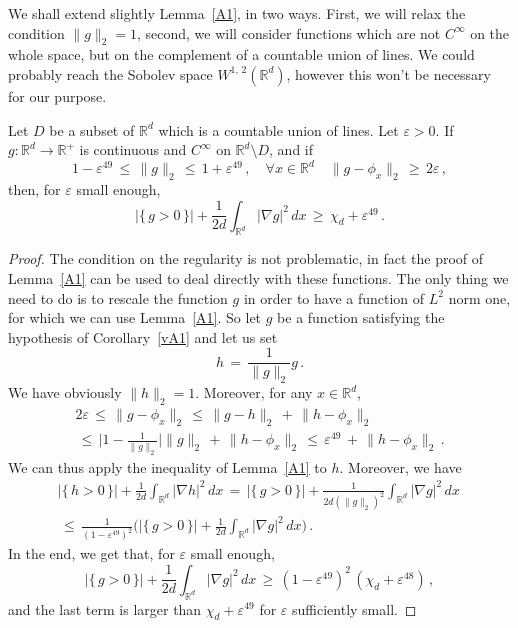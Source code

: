 \documentclass[10pt]{amsart}
\theoremstyle{definition}\newtheorem{defi}[theo]{Definition}\newtheorem{rema}[theo]{Remark}\newtheorem{exam}[theo]{Example}\newtheorem{exem}[theo]{Example}\newtheorem{nota}[theo]{Notation}
\newcommand*\Rd {{\mathbb R^d}}
\newcommand*\R{\mathbb{R}}
\let\oldforall\forall
\renewcommand*{\forall}{\mathrel{\oldforall}}
\begin{document}
We shall extend slightly Lemma~\ref{A1}, in two ways. First, we will relax the condition $\|g\|_2=1$, second, we will consider functions which are not $C^\infty$ on the whole space, but on the complement of a countable union of lines. We could probably reach the Sobolev space $W^{1,\,2}(\Rd)$, however this won't be necessary for our purpose.
\begin{coro}\label{vA1}
Let $D$ be a subset of $\Rd$ which is a countable union of lines. Let $\varepsilon>0$. If $g:\Rd\to\R^+$ is continuous and $C^\infty$ on $\Rd\setminus D$, and if
\[
1-\varepsilon^{49}\,\leq\,\|g\|_2\,\leq\,1 +\varepsilon^{49}\,,\quad
\forall{x\in\Rd}\quad\|g-\phi_x\|_2\,\geq\,2\varepsilon\,,
\]
then, for $\varepsilon$ small enough,
\[
\big|\{\,g>0\,\}\big|+\frac{1}{2d}
\int_{\Rd}\big|\nabla g\big|^2\,dx\,\geq\,\chi_d+\varepsilon^{49}\,.
\]
\end{coro}
\begin{proof}
The condition on the regularity is not problematic, in fact the proof of Lemma~\ref{A1} can be used to deal directly with these functions. The only thing we need to do is to rescale the function $g$ in order to have a function of $L^2$ norm one, for which we can use Lemma~\ref{A1}. So let $g$ be a function satisfying the hypothesis of Corollary~\ref{vA1} and let us set
\[
h\,=\,\frac{1}{\|g\|_2}g\,.
\]
We have obviously $\|h\|_2=1$. Moreover, for any $x\in \Rd$,
\begin{multline*}
2\varepsilon\,\leq\, \|g-\phi_x\|_2\,\leq\, \|g-h\|_2\,+\, \|h-\phi_x\|_2
\\ \,\leq\,
\Big|1-
\frac{1}{\|g\|_2}\Big| \|g\|_2
\,+\, \|h-\phi_x\|_2
\,\leq\,
\varepsilon^{49}
\,+\, \|h-\phi_x\|_2\,.
\end{multline*}
We can thus apply the inequality of Lemma~\ref{A1} to $h$. Moreover, we have
\begin{multline*}
\big|\{\,h>0\,\}\big|+\frac{1}{2d}
\int_{\Rd}\big|\nabla h\big|^2\,dx\,=\,
\big|\{\,g>0\,\}\big|+\frac{1}{2d (\|g\|_2)^2 }
\int_{\Rd}\big|\nabla g\big|^2\,dx\,
\\
\,\leq\,
\frac{1}{(1-\varepsilon^{49})^2}\Big(
\big|\{\,g>0\,\}\big|+\frac{1}{2d }
\int_{\Rd}\big|\nabla g\big|^2\,dx\Big)\,.
\end{multline*}
In the end, we get that, for $\varepsilon$ small enough,
\[
\big|\{\,g>0\,\}\big|+\frac{1}{2d }
\int_{\Rd}\big|\nabla g\big|^2\,dx\,\geq\, \left(1-\varepsilon^{49}\right)^2\,\left(\chi_d+\varepsilon^{48}\right)\,,
\]
and the last term is larger than $\chi_d+\varepsilon^{49}$ for $\varepsilon$ sufficiently small.
\end{proof}
\end{document}
